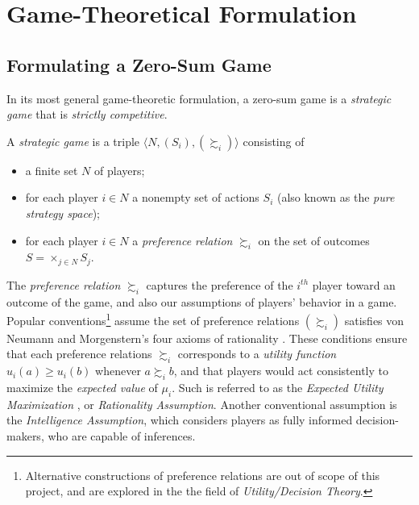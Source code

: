 \documentclass[journal, 11pt, a4paper, twoside]{IEEEtran}
\begin{document}
\section{Game-Theoretical Formulation}
\subsection{Formulating a Zero-Sum Game}
In its most general game-theoretic formulation, a zero-sum game is a \textit{strategic game} that is \textit{strictly competitive}. 
\begin{definition} A \textit{strategic game} is a triple $\langle N, (S_i), (\succsim_i) \rangle$ consisting of
\begin{itemize}
    \item a finite set $N$ of players;
    \item for each player $i \in N$ a nonempty set of actions $S_i$ (also known as the \textit{pure strategy space});
    \item for each player $i \in N$ a \textit{preference relation} $\succsim_i$ on the set of outcomes $S = \times_{j \in N}S_j$.
\end{itemize}
\end{definition}

The \textit{preference relation} $\succsim_i$ captures the preference of the $i^{th}$ player toward an outcome of the game, and also our assumptions of players' behavior in a game. Popular conventions\footnote{Alternative constructions of preference relations are out of scope of this project, and are explored in the the field of \textit{Utility/Decision Theory}.} assume the set of preference relations $(\succsim_i)$ satisfies von Neumann and Morgenstern's four axioms of rationality \cite{myerson_game_2013}. These conditions ensure that each preference relations $\succsim_i$ corresponds to a \textit{utility function} $u_i(a) \geq u_i(b)$ whenever $a \succsim_i b$, and that players would act consistently to maximize the \textit{expected value} of $\mu_i$. Such is referred to as the 
\textit{Expected Utility Maximization} \cite{myerson_game_2013}, or \textit{Rationality Assumption}. Another conventional assumption is the \textit{Intelligence Assumption}, which considers players as fully informed decision-makers, who are capable of inferences.
\end{document}
